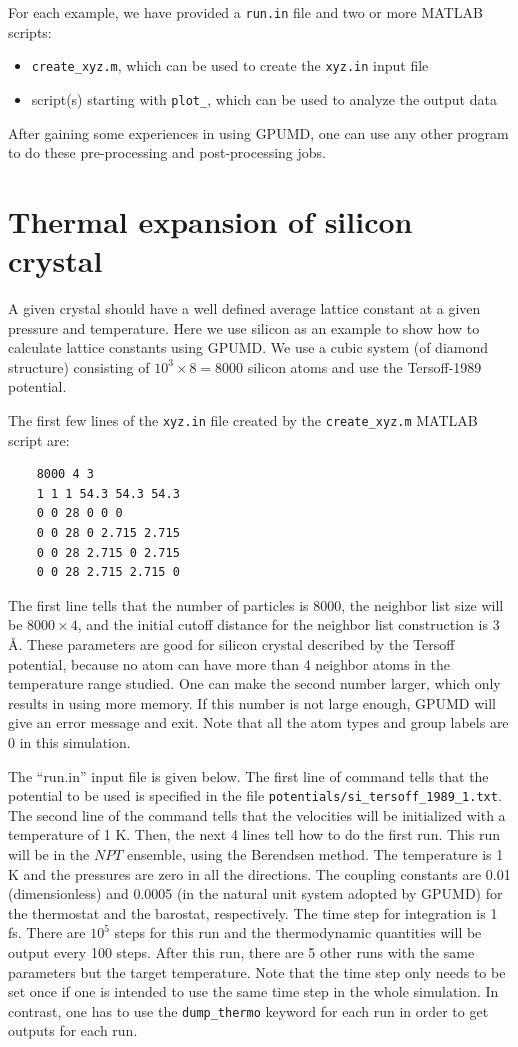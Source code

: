 \documentclass[12pt,a4paper]{report}
\begin{document}
For each example, we have provided a \verb"run.in" file and two or more MATLAB scripts:
\begin{itemize}
\item \verb"create_xyz.m", which can be used to create the \verb"xyz.in" input file
\item script(s) starting with \verb"plot_", which can be used to analyze the output data
\end{itemize}
After gaining some experiences in using GPUMD, one can use any other program to do these pre-processing and post-processing jobs.


\section{Thermal expansion of silicon crystal}


A given crystal should have a well defined average lattice constant at a given pressure and temperature. Here we use silicon as an example to show how to calculate lattice constants using GPUMD. We use a cubic system (of diamond structure) consisting of $10^3\times 8 = 8000$ silicon atoms and use the Tersoff-1989 potential.

The first few lines of the \verb"xyz.in" file created by the \verb"create_xyz.m" MATLAB script are:
\begin{verbatim}
    8000 4 3
    1 1 1 54.3 54.3 54.3
    0 0 28 0 0 0
    0 0 28 0 2.715 2.715
    0 0 28 2.715 0 2.715
    0 0 28 2.715 2.715 0
\end{verbatim}
The first line tells that the number of particles is 8000, the neighbor list size will be
$8000\times 4$, and the initial cutoff distance for the neighbor list construction is 3 \AA.
These parameters are good for silicon crystal described by the Tersoff potential, because no atom can have more than 4 neighbor atoms in the temperature range studied. One can make the second number larger, which only results in using more memory. If this number is not large enough, GPUMD will give an error message and exit. Note that all the atom types and group labels are 0 in this simulation.

The ``run.in'' input file is given below. The first line of command tells that the potential to be used is specified in the file \verb"potentials/si_tersoff_1989_1.txt".  The second line of the command tells that the velocities will be initialized with a temperature of 1 K. Then, the next 4 lines tell how to do the first run. This run will be in the $NPT$ ensemble, using the Berendsen method. The temperature is 1 K and the pressures are zero in all the directions. The coupling constants are 0.01 (dimensionless) and 0.0005 (in the natural unit system adopted by GPUMD) for the thermostat and the barostat, respectively. The time step for integration is 1 fs. There are $10^5$ steps for this run and the thermodynamic quantities will be output every 100 steps. After this run, there are 5 other runs with the same parameters but the target temperature. Note that the time step only needs to be set once if one is intended to use the same time step in the whole simulation. In contrast, one has to use the \verb"dump_thermo" keyword for each run in order to get outputs for each run.
\end{document}
